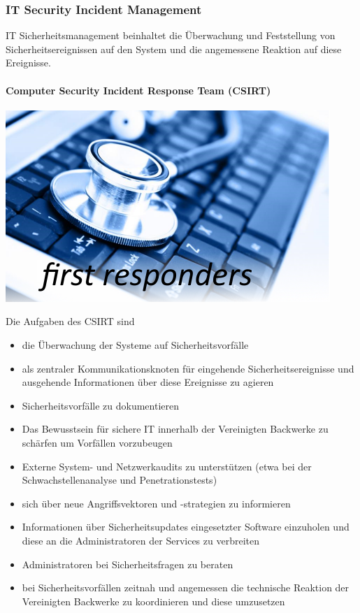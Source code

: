 \documentclass[]{article}
\let\oldparagraph\paragraph
\renewcommand{\paragraph}[1]{\oldparagraph{#1}\mbox{}}
\begin{document}
\subsubsection{IT Security Incident
Management}\label{it-security-incident-management}

IT Sicherheitsmanagement beinhaltet die Überwachung und Feststellung von
Sicherheitsereignissen auf den System und die angemessene Reaktion auf
diese Ereignisse.

\paragraph{Computer Security Incident Response Team
(CSIRT)}\label{computer-security-incident-response-team-csirt}

\includegraphics[width=4.83401in,height=2.85457in]{images/image3.png}

Die Aufgaben des CSIRT sind

\begin{itemize}
\item
  die Überwachung der Systeme auf Sicherheitsvorfälle
\item
  als zentraler Kommunikationsknoten für eingehende
  Sicherheitsereignisse und ausgehende Informationen über diese
  Ereignisse zu agieren
\item
  Sicherheitsvorfälle zu dokumentieren
\item
  Das Bewusstsein für sichere IT innerhalb der Vereinigten Backwerke zu
  schärfen um Vorfällen vorzubeugen
\item
  Externe System- und Netzwerkaudits zu unterstützen (etwa bei der
  Schwachstellenanalyse und Penetrationstests)
\item
  sich über neue Angriffsvektoren und -strategien zu informieren
\item
  Informationen über Sicherheitsupdates eingesetzter Software einzuholen
  und diese an die Administratoren der Services zu verbreiten
\item
  Administratoren bei Sicherheitsfragen zu beraten
\item
  bei Sicherheitsvorfällen zeitnah und angemessen die technische
  Reaktion der Vereinigten Backwerke zu koordinieren und diese
  umzusetzen
\end{itemize}
\end{document}
